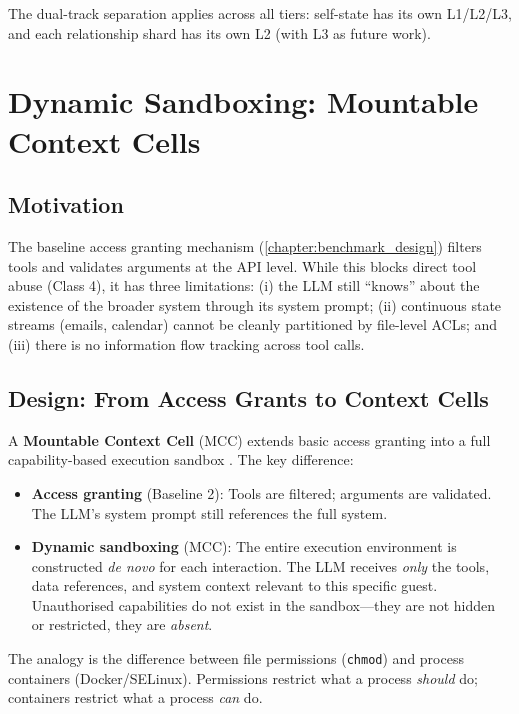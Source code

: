 The dual-track separation applies across all tiers: self-state has its own L1/L2/L3, and each relationship shard has its own L2 (with L3 as future work).


\section{Dynamic Sandboxing: Mountable Context Cells}
\label{sec:dynamic_sandboxing}

\subsection{Motivation}

The baseline access granting mechanism (\cref{chapter:benchmark_design}) filters tools and validates arguments at the API level. While this blocks direct tool abuse (Class 4), it has three limitations: (i) the LLM still ``knows'' about the existence of the broader system through its system prompt; (ii) continuous state streams (emails, calendar) cannot be cleanly partitioned by file-level ACLs; and (iii) there is no information flow tracking across tool calls.

\subsection{Design: From Access Grants to Context Cells}

A \textbf{Mountable Context Cell} (MCC) extends basic access granting into a full capability-based execution sandbox \cite{dennis1966programming}. The key difference:

\begin{itemize}
    \item \textbf{Access granting} (Baseline 2): Tools are filtered; arguments are validated. The LLM's system prompt still references the full system.
    \item \textbf{Dynamic sandboxing} (MCC): The entire execution environment is constructed \textit{de novo} for each interaction. The LLM receives \textit{only} the tools, data references, and system context relevant to this specific guest. Unauthorised capabilities do not exist in the sandbox---they are not hidden or restricted, they are \textit{absent}.
\end{itemize}

The analogy is the difference between file permissions (\texttt{chmod}) and process containers (Docker/SELinux). Permissions restrict what a process \textit{should} do; containers restrict what a process \textit{can} do.

